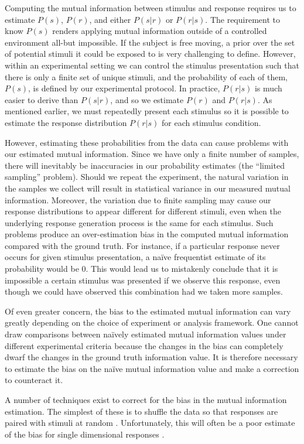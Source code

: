 Computing the mutual information between stimulus and response requires us to estimate $P(s)$, $P(r)$, and either $P(s|r)$ or $P(r|s)$.
The requirement to know $P(s)$ renders applying mutual information outside of a controlled environment all-but impossible.
If the subject is free moving, a prior over the set of potential stimuli it could be exposed to is very challenging to define.
However, within an experimental setting we can control the stimulus presentation such that there is only a finite set of unique stimuli, and the probability of each of them, $P(s)$, is defined by our experimental protocol.
In practice, $P(r|s)$ is much easier to derive than $P(s|r)$, and so we estimate $P(r)$ and $P(r|s)$.
As mentioned earlier, we must repeatedly present each stimulus so it is possible to estimate the response distribution $P(r|s)$ for each stimulus condition.

However, estimating these probabilities from the data can cause problems with our estimated mutual information.
Since we have only a finite number of samples, there will inevitably be inaccuracies in our probability estimates (the ``limited sampling'' problem).
Should we repeat the experiment, the natural variation in the samples we collect will result in statistical variance in our measured mutual information.
Moreover, the variation due to finite sampling may cause our response distributions to appear different for different stimuli, even when the underlying response generation process is the same for each stimulus.
Such problems produce an over-estimation bias in the computed mutual information compared with the ground truth.
For instance, if a particular response never occurs for given stimulus presentation, a na{\"i}ve frequentist estimate of its probability would be $0$.
This would lead us to mistakenly conclude that it is impossible a certain stimulus was presented if we observe this response, even though we could have observed this combination had we taken more samples.

Of even greater concern, the bias to the estimated mutual information can vary greatly depending on the choice of experiment or analysis framework.
One cannot draw comparisons between na{\"i}vely estimated mutual information values under different experimental criteria because the changes in the bias can completely dwarf the changes in the ground truth information value.
It is therefore necessary to estimate the bias on the na{\"i}ve mutual information value and make a correction to counteract it.

\label{sec:info-bias}
A number of techniques exist to correct for the bias in the mutual information estimation.
The simplest of these is to shuffle the data so that responses are paired with stimuli at random \citep{Optican1991}.
Unfortunately, this will often be a poor estimate of the bias for single dimensional responses \citep{Panzeri1996}.

